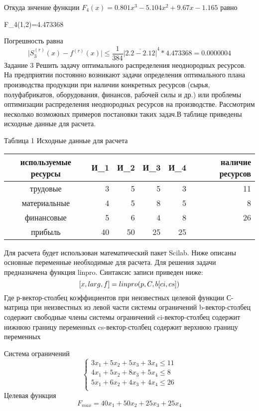 \documentclass[russian,utf8,nocolumnxxxi,nocolumnxxxii]{eskdtext}
\begin{document}
Откуда знчение функции $F_4(x)=0.801x^3-5.104x^2+9.67x-1.165$ равно

F_4(1,2)=4.473368

Погрешность равна
\begin{equation}
\mid S^{(r)}_3(x) - f^{(r)}(x) \mid \leqslant \frac{1}{384} \bar{|2.2-2.12|}^4*4.473368=0.0000004
\end{equation} 
\newpage
Задание 3
Решить задачу оптимального распределения неоднородных ресурсов. На предприятии постоянно возникают задачи определения
оптимального плана производства продукции при наличии конкретных ресурсов (сырья, полуфабрикатов, оборудования, финансов, рабочей силы и др.) или проблемы оптимизации распределения неоднородных ресурсов на производстве. Рассмотрим несколько возможных примеров постановки таких задач.В таблице приведены исходные данные для расчета.

Таблица 1 Исходные данные для расчета

\begin{tabular}{|c|r|r|r|r|r|}
\hline
используемые ресурсы & И_1 & И_2 & И_3 & И_4 & наличие ресурсов \\
\hline
трудовые & 3 & 5 & 5 & 3 & 11 \\
\hline
материальные & 4 & 5 & 8 & 5 & 8 \\
\hline
финансовые & 5 & 6 & 4 & 8 & 26 \\
\hline
прибыль & 40 & 50 & 25 & 25 &  \\
\hline
\end{tabular}

Для расчета будет использован математический пакет Scilab. Ниже описаны основные переменные необходимые для расчета.
Для решения задачи предназначена функция linpro. Синтаксис записи приведен ниже:
\begin{equation}
$$[x,larg,f]=linpro(p,C,b[ci,cs])$$
\end{equation}
Где р-вектор-столбец коэффициентов при неизвестных целевой функции
С-матрица при неизвестных из левой части системы ограничений
b-вектор-столбец содержит свободные члены системы ограничений
ci-вектор-столбец содержит нижнюю границу переменных
cs-вектор-столбец содержит верхнюю границу переменных

Система ограничений
\begin{equation}
\left\{
\begin{array}{l}
    3x_1+5x_2+5x_3+3x_4 \leq 11\\
    4x_1+5x_2+8x_3+5x_4 \leq 8\\
    5x_1+6x_2+4x_3+4x_4 \leq 26\\
\end{array}
\right.
\end{equation}
Целевая функция 
\begin{equation}
F_{max}=40x_1+50x_2+25x_3+25x_4
\end{equation}
\end{document}
